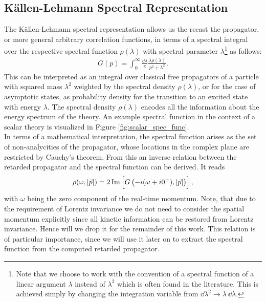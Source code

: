 \subsection{K\"allen-Lehmann Spectral Representation}
The K\"allen-Lehmann spectral representation \cite{Kallen1952, Lehmann1954} allows us the recast the propagator, or more general arbitrary correlation functions, in terms of a spectral integral over the respective spectral function $\rho(\lambda)$ with spectral parameter $\lambda$\footnote{Note that we choose to work with the convention of a spectral function of a linear argument $\lambda$ instead of $\lambda^2$ which is often found in the literature. This is achieved simply by changing the integration variable from $\dd\lambda^2 \rightarrow \lambda\ \dd\lambda$.} as follows:
\begin{align} 
G(p)=\int_{0}^{\infty} \frac{\dd \lambda}{\pi} \frac{\lambda\rho(\lambda)}{p^{2}+\lambda^{2}}. \label{eqn:KL_rep}
\end{align}
This can be interpreted as an integral over classical free propagators of a particle with squared mass $\lambda^2$ weighted by the spectral density $\rho(\lambda)$, or for the case of asymptotic states, as probability density for the transition to an excited state with energy $\lambda$. The spectral density $\rho(\lambda)$ encodes all the information about the energy spectrum of the theory. An example spectral function in the context of a scalar theory is visualized in Figure \ref{fig:scalar_spec_func}.\\
In terms of a mathematical interpretation, the spectral function arises as the set of non-analycities of the propagator, whose locations in the complex plane are restricted by Cauchy's theorem. From this an inverse relation between the retarded propagator and the spectral function can be derived. It reads
\begin{equation}
	\rho(\omega, \abs{\vec{p}}) = 2 \operatorname{Im}\left[G\left(-i(\omega + i0^+), \abs{\vec{p}}\right)\right], \label{eqn:specfunc_relation}
\end{equation}
with $\omega$ being the zero component of the real-time momentum. Note, that due to the requirement of Lorentz invariance we do not need to consider the spatial momentum explicitly since all kinetic information can be restored from Lorentz invariance. Hence will we drop it for the remainder of this work. This relation is of particular importance, since we will use it later on to extract the spectral function from the computed retarded propagator. \\ 
